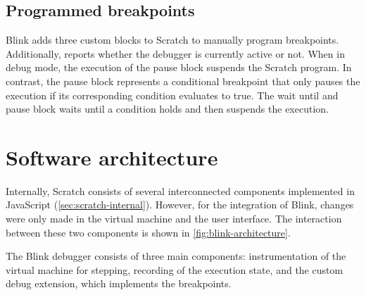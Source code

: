 \documentclass[../main]{subfiles}
\begin{document}
\subsection{Programmed breakpoints}\label{subsec:programmed-breakpoints}

\begin{varwidth}{0.2\linewidth}
    \begin{scratch}[scale=0.6]
    \end{scratch}
\end{varwidth}%
\hspace{1em}%
\begin{varwidth}{0.4\linewidth}
    \begin{scratch}[scale=0.6]
    \end{scratch}
\end{varwidth}%
\hspace{1em}%
\begin{varwidth}{0.5\linewidth}
    \begin{scratch}[scale=0.6]
    \end{scratch}
\end{varwidth}%

Blink adds three custom blocks to Scratch to manually program breakpoints.
Additionally,  reports whether the debugger is currently active or not.
When in debug mode, the execution of the pause block suspends the Scratch program.
In contrast, the pause block represents a conditional breakpoint that only pauses the execution if its corresponding condition evaluates to true.
The wait until and pause block waits until a condition holds and then suspends the execution.

\section{Software architecture}\label{sec:blink-software-architecture}

Internally, Scratch consists of several interconnected components implemented in JavaScript (\cref{sec:scratch-internal}).
However, for the integration of Blink, changes were only made in the virtual machine and the user interface.
The interaction between these two components is shown in \cref{fig:blink-architecture}.

The Blink debugger consists of three main components: instrumentation of the virtual machine for stepping, recording of the execution state, and the custom debug extension, which implements the breakpoints.
\end{document}
